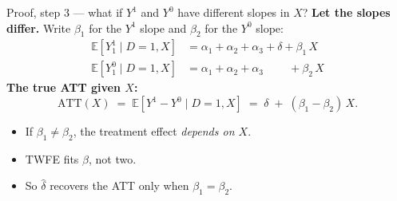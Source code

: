\documentclass[aspectratio=169,11pt]{beamer}
\begin{document}
\begin{frame}{Proof, step 3 --- what if $Y^1$ and $Y^0$ have different slopes in $X$?}
\vspace{0.4em}
\textbf{Let the slopes differ.} \;Write $\beta_1$ for the $Y^1$ slope and $\beta_2$ for the $Y^0$ slope:
\begin{align*}
\mathbb{E}[Y^1_1 \mid D{=}1, X] &= \alpha_1 + \alpha_2 + \alpha_3 + \delta + \boxed{\beta_1}\, X \\
\mathbb{E}[Y^0_1 \mid D{=}1, X] &= \alpha_1 + \alpha_2 + \alpha_3 \phantom{\;+\;\delta} + \boxed{\beta_2}\, X
\end{align*}
\vspace{0.1em}
\textbf{The true ATT given $X$:}
\[
\text{ATT}(X) \;=\; \mathbb{E}[Y^1 - Y^0 \mid D{=}1, X] \;=\; \delta \;+\; (\beta_1 - \beta_2)\, X.
\]
\vspace{0.2em}
\begin{itemize}\small
  \item If $\beta_1 \neq \beta_2$, the treatment effect \textit{depends on $X$}.
  \item TWFE fits  $\beta$, not two.
  \item So $\widehat{\delta}$ recovers the ATT only when $\beta_1 = \beta_2$.
\end{itemize}
\end{frame}
\end{document}
